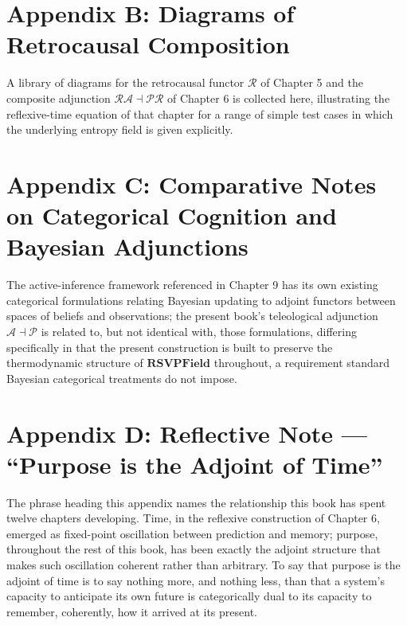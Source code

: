 \chapter*{Appendix B: Diagrams of Retrocausal Composition}

A library of diagrams for the retrocausal functor $\mathcal{R}$ of Chapter 5 and the composite adjunction $\mathcal{R}\mathcal{A} \dashv \mathcal{P}\mathcal{R}$ of Chapter 6 is collected here, illustrating the reflexive-time equation of that chapter for a range of simple test cases in which the underlying entropy field is given explicitly.

\chapter*{Appendix C: Comparative Notes on Categorical Cognition and Bayesian Adjunctions}

The active-inference framework referenced in Chapter 9 has its own existing categorical formulations relating Bayesian updating to adjoint functors between spaces of beliefs and observations; the present book's teleological adjunction $\mathcal{A} \dashv \mathcal{P}$ is related to, but not identical with, those formulations, differing specifically in that the present construction is built to preserve the thermodynamic structure of $\mathbf{RSVPField}$ throughout, a requirement standard Bayesian categorical treatments do not impose.

\chapter*{Appendix D: Reflective Note --- ``Purpose is the Adjoint of Time''}

The phrase heading this appendix names the relationship this book has spent twelve chapters developing. Time, in the reflexive construction of Chapter 6, emerged as fixed-point oscillation between prediction and memory; purpose, throughout the rest of this book, has been exactly the adjoint structure that makes such oscillation coherent rather than arbitrary. To say that purpose is the adjoint of time is to say nothing more, and nothing less, than that a system's capacity to anticipate its own future is categorically dual to its capacity to remember, coherently, how it arrived at its present.
